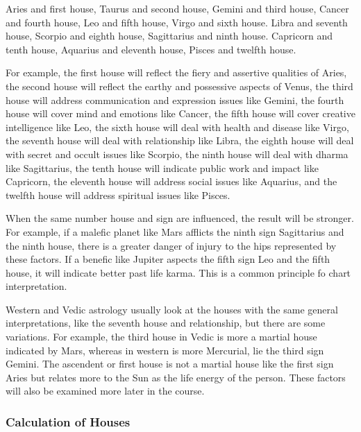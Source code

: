 

Aries and first house, Taurus and second house, Gemini and third house,
Cancer and fourth house, Leo and fifth house, Virgo and sixth house.
Libra and seventh house, Scorpio and eighth house, Sagittarius and ninth house.
Capricorn and tenth house, Aquarius and eleventh house, Pisces and twelfth house.
 

For example, the first house will reflect the fiery and assertive qualities of Aries, the second house will reflect the earthy and possessive aspects of Venus, the third house will address communication and expression issues like Gemini, the fourth house will cover mind and emotions like Cancer, the fifth house will cover creative intelligence like Leo, the sixth house will deal with health and disease like Virgo, the seventh house will deal with relationship like Libra, the eighth house will deal with secret and occult issues like Scorpio, the ninth house will deal with dharma like Sagittarius, the tenth house will indicate public work and impact like Capricorn, the eleventh house will address social issues like Aquarius, and the twelfth house will address spiritual issues like Pisces.

 

When the same number house and sign are influenced, the result will be stronger. For example, if a malefic planet like Mars afflicts the ninth sign Sagittarius and the ninth house, there is a greater danger of injury to the hips represented by these factors. If a benefic like Jupiter aspects the fifth sign Leo and the fifth house, it will indicate better past life karma. This is a common principle fo chart interpretation.

 

Western and Vedic astrology usually look at the houses with the same general interpretations, like the seventh house and relationship, but there are some variations. For example, the third house in Vedic is more a martial house indicated by Mars, whereas in western is more Mercurial, lie the third sign Gemini. The ascendent or first house is not a martial house like the first sign Aries but relates more to the Sun as the life energy of the person. These factors will also be examined more later in the course.

 

\subsubsection{Calculation of Houses}
 

